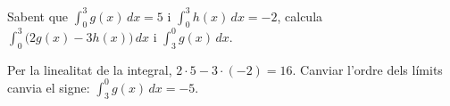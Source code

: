 \begin{apartats}
\begin{nomesllarg}
Sabent que $\displaystyle\int_0^3 g(x)\,dx=5$ i $\displaystyle\int_0^3 h(x)\,dx=-2$, calcula
$\displaystyle\int_0^3\bigl(2g(x)-3h(x)\bigr)\,dx$ i $\displaystyle\int_3^0 g(x)\,dx$.

\begin{solucio}
Per la linealitat de la integral, $2\cdot5-3\cdot(-2)=16$. Canviar l'ordre dels límits canvia el signe:
$\displaystyle\int_3^0 g(x)\,dx=-5$.
\end{solucio}
\end{nomesllarg}

\end{apartats}
